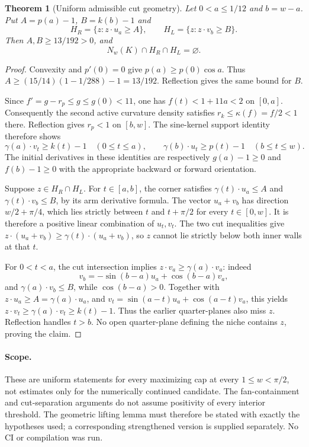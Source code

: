 \documentclass[11pt]{article}
\newtheorem{theorem}{Theorem}[section]
\begin{document}
\begin{theorem}[Uniform admissible cut geometry]\label{thm:cuts}
Let $0<a\le1/12$ and $b=w-a$. Put $A=p(a)-1$, $B=k(b)-1$ and
\[
 H_R=\{z:z\cdot u_a\ge A\},\qquad H_L=\{z:z\cdot v_b\ge B\}.
\]
Then $A,B\ge13/192>0$, and
\[
 \boxed{N_w(K)\cap H_R\cap H_L=\varnothing.}
\]
\end{theorem}
\begin{proof}
Convexity and $p'(0)=0$ give $p(a)\ge p(0)\cos a$. Thus $A\ge(15/14)(1-1/288)-1=13/192$. Reflection gives the same bound for $B$.

Since $f'=g-r_p\le g\le g(0)<11$, one has $f(t)<1+11a<2$ on $[0,a]$. Consequently the second active curvature density satisfies $r_k\le\kappa(f)=f/2<1$ there. Reflection gives $r_p<1$ on $[b,w]$. The sine-kernel support identity therefore shows
\[
 \gamma(a)\cdot v_t\ge k(t)-1\quad(0\le t\le a),\qquad
 \gamma(b)\cdot u_t\ge p(t)-1\quad(b\le t\le w).
\]
The initial derivatives in these identities are respectively $g(a)-1\ge0$ and $f(b)-1\ge0$ with the appropriate backward or forward orientation.

Suppose $z\in H_R\cap H_L$. For $t\in[a,b]$, the corner satisfies $\gamma(t)\cdot u_a\le A$ and $\gamma(t)\cdot v_b\le B$, by its arm derivative formula. The vector $u_a+v_b$ has direction $w/2+\pi/4$, which lies strictly between $t$ and $t+\pi/2$ for every $t\in[0,w]$. It is therefore a positive linear combination of $u_t,v_t$. The two cut inequalities give $z\cdot(u_a+v_b)\ge\gamma(t)\cdot(u_a+v_b)$, so $z$ cannot lie strictly below both inner walls at that $t$.

For $0<t<a$, the cut intersection implies $z\cdot v_a\ge\gamma(a)\cdot v_a$: indeed
\[
 v_b=-\sin(b-a)u_a+\cos(b-a)v_a,
\]
and $\gamma(a)\cdot v_b\le B$, while $\cos(b-a)>0$. Together with $z\cdot u_a\ge A=\gamma(a)\cdot u_a$, and
$v_t=\sin(a-t)u_a+\cos(a-t)v_a$, this yields $z\cdot v_t\ge\gamma(a)\cdot v_t\ge k(t)-1$. Thus the earlier quarter-planes also miss $z$. Reflection handles $t>b$. No open quarter-plane defining the niche contains $z$, proving the claim.
\end{proof}

\paragraph{Scope.}
These are uniform statements for every maximizing cap at every $1\le w<\pi/2$, not estimates only for the numerically continued candidate. The fan-containment and cut-separation arguments do not assume positivity of every interior threshold. The geometric lifting lemma must therefore be stated with exactly the hypotheses used; a corresponding strengthened version is supplied separately. No CI or compilation was run.
\end{document}
